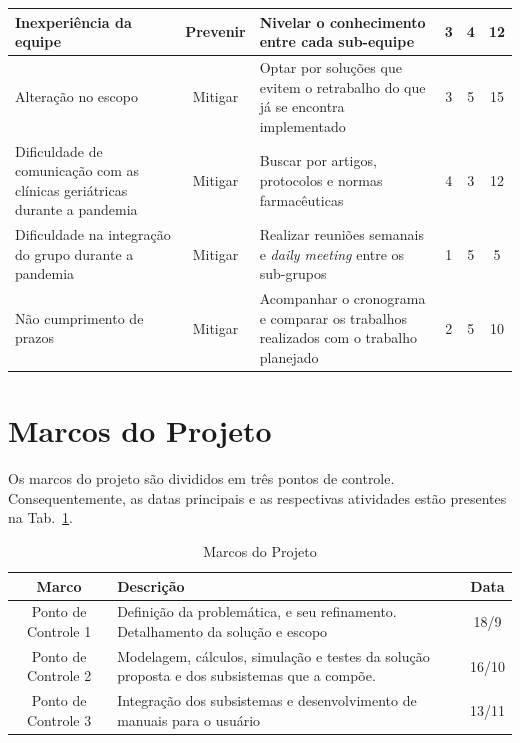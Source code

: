 \begin{apendicesenv}
\begin{table}[H]
\begin{adjustbox}{max width = \textwidth}
\begin{tabular}{|L{5cm}|c|L{4cm}|c|c|c|}
             Inexperiência da equipe  & Prevenir & Nivelar o conhecimento entre cada sub-equipe & 3 & 4 & 12 \\ \hline
             
             Alteração no escopo & Mitigar & Optar por soluções que evitem o retrabalho do que já se encontra implementado & 3 & 5 & 15 \\ \hline
             
             Dificuldade de comunicação com as clínicas geriátricas durante a pandemia & Mitigar & Buscar por artigos, protocolos e normas farmacêuticas & 4 & 3 & 12 \\ \hline
              
             Dificuldade na integração do grupo durante a pandemia & Mitigar & Realizar reuniões semanais e \textit{daily meeting} entre os sub-grupos  & 1 & 5 & 5 \\ \hline
             
             Não cumprimento de prazos & Mitigar & Acompanhar o cronograma e comparar os trabalhos realizados com o trabalho planejado & 2 & 5 & 10 \\ \hline
        \end{tabular}
    \end{adjustbox}
\end{table}

\section{Marcos do Projeto}

Os marcos do projeto são divididos em três pontos de controle. Consequentemente, as datas principais e as respectivas atividades estão presentes na Tab.~\ref{tab:marcos}.

\begin{table}[H]
    \centering
    \caption{Marcos do Projeto}
    \label{tab:marcos}
    \begin{tabularx}{\textwidth}{|c|X|c|}
        \hline
        \rowcolor[HTML]{A8DADC}
        \textbf{Marco} & \textbf{Descrição} & \textbf{Data} \\ \hline
        Ponto de Controle 1 & Definição da problemática, e seu refinamento. Detalhamento da solução e escopo & 18/9 \\\hline
        Ponto de Controle 2 &  Modelagem, cálculos, simulação e testes da solução proposta e dos subsistemas que a compõe. & 16/10 \\ \hline
        Ponto de Controle 3 & Integração dos subsistemas e desenvolvimento de manuais para o usuário & 13/11 \\ \hline
    \end{tabularx}
\end{table}



\end{apendicesenv}
